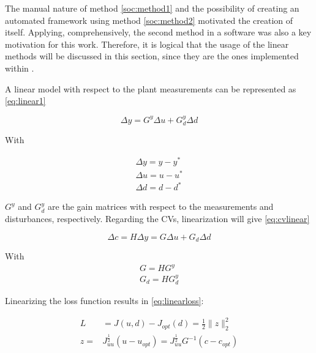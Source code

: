 \documentclass[../msc-thesis.tex]{subfiles}
\begin{document}
The manual nature of method \ref{soc:method1} and the possibility of creating 
an automated framework using method \ref{soc:method2} motivated the creation 
of \mtc itself. Applying, comprehensively, the second method in a software was 
also a key motivation for this work. Therefore, it is logical that the usage 
of the linear methods will be discussed in this section, since they are the 
ones implemented within \mtc.

A linear model with respect to the plant measurements can be represented as 
\autoref{eq:linear1}

\begin{equation}
	\Delta y=G^{y} \Delta u+G_{d}^{y} \Delta d
	\label{eq:linear1}
\end{equation}

With

\begin{equation}
	\begin{array}{l}
		{\Delta y=y-y^{*}} \\
		{\Delta u=u-u^{*}} \\
		{\Delta d=d-d^{*}}
		\end{array}
	\label{eq:linear2}
\end{equation}

$G^{y}$ and $G^{y}_{d}$ are the gain matrices with respect to the measurements 
and disturbances, respectively. Regarding the CVs, linearization will give 
\autoref{eq:cvlinear}

\begin{equation}
	\Delta c=H \Delta y=G \Delta u+G_{d} \Delta d
	\label{eq:cvlinear}
\end{equation}

With
\begin{equation}
\begin{array}{l}
	{G=HG^{y}} \\
	{G_{d}=H G_{d}^{y}}
	\end{array}
	\label{eq:linear3}
\end{equation}

Linearizing the loss function results in \autoref{eq:linearloss}:

\begin{equation}
	\begin{aligned}
		L &=J(u, d)-J_{o p t}(d)=\frac{1}{2}\|z\|_{2}^{2} \\
		z=& J_{u u}^{\frac{1}{2}}\left(u-u_{o p t}\right)=J_{u u}^{\frac{1}{2}} G^{-1}\left(c-c_{o p t}\right)
	\end{aligned}
	\label{eq:linearloss}
\end{equation}
\end{document}
